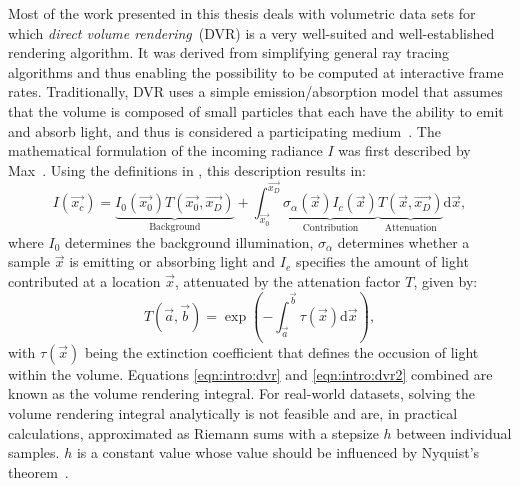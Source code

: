 Most of the work presented in this thesis deals with  volumetric data sets for which \emph{direct volume rendering}~(DVR) is a very well-suited and well-established rendering algorithm. It was derived from simplifying general ray tracing algorithms and thus enabling the possibility to be computed at interactive frame rates.  Traditionally, DVR uses a simple emission/absorption model that assumes that the volume is composed of small particles that each have the ability to emit and absorb light, and thus is considered a participating medium~\cite{levoy1988display, drebin1988volume, sabella1988rendering}.  The mathematical formulation of the incoming radiance $I$ was first described by Max~\cite{max1995optical, max2010local}.  Using the definitions in , this description results in:
\begin{equation}
I(\vec{x_c}) = \underbrace{I_0 \left( \vec{x_0} \right) T\left( \vec{x_0}, \vec{x_D} \right)}_{\textrm{Background}} + \int_\vec{x_0}^\vec{x_D} \underbrace{\sigma_\alpha(\vec{x}) I_c(\vec{x})}_{\textrm{Contribution}}  \underbrace{T(\vec{x}, \vec{x_D})}_{\textrm{Attenuation}} \textrm{d} \vec{x},
\label{eqn:intro:dvr}
\end{equation}
\noindent where $I_0$ determines the background illumination, $\sigma_\alpha$ determines whether a sample $\vec{x}$ is emitting or absorbing light and $I_e$ specifies the amount of light contributed at a location $\vec{x}$, attenuated by the attenation factor $T$, given by:
\begin{equation}
T(\vec{a}, \vec{b}) = \exp \left( -\int_\vec{a}^\vec{b} \tau(\vec{x}) \textrm{d} \vec{x} \right),
\label{eqn:intro:dvr2}
\end{equation}
\noindent with $\tau(\vec{x})$ being the extinction coefficient that defines the occusion of light within the volume.  Equations \ref{eqn:intro:dvr} and \ref{eqn:intro:dvr2} combined are known as the volume rendering integral.  For real-world datasets, solving the volume rendering integral analytically is not feasible and are, in practical calculations, approximated as Riemann sums with a stepsize $h$ between individual samples.  $h$ is a constant value whose value should be influenced by Nyquist's theorem~\cite{shannon1949communication}.

